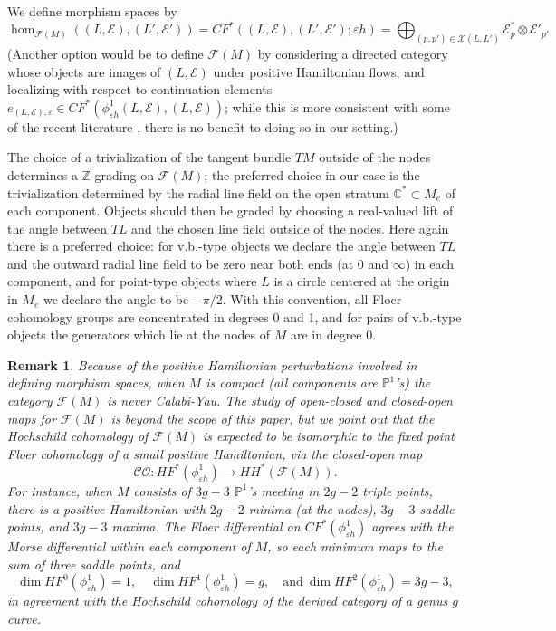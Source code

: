 \documentclass[11pt,leqno]{amsart}
\newtheorem{remark}[theo]{Remark}
\numberwithin{equation}{section}
\def\C{\mathbb{C}}
\def\Z{\mathbb{Z}}
\def\F{{\mathcal F}}
\def\PP{{\mathbb P}}
\newcommand{\cE}{{\mathcal E}}
\newcommand{\cX}{{\mathcal X}}
\begin{document}
We define morphism spaces by
\begin{equation} \label{eq:morphisms}
\hom_{\F(M)}((L,\cE),(L',\cE'))=CF^*((L,\cE),(L',\cE');\varepsilon h)=\bigoplus_{(p,p')\in \cX(L,L')} \cE_p^*\otimes
\cE'_{p'}
\end{equation}
(Another option would be to define $\F(M)$ by considering a directed category whose
objects are images of $(L,\cE)$ under positive Hamiltonian flows, and
localizing with respect to continuation elements $e_{(L,\cE),\varepsilon}\in
CF^*(\phi^1_{\varepsilon h}(L,\cE),(L,\cE))$; while this is more consistent
with some of the recent literature \cite{AA,AS}, there is no benefit
to doing so in our setting.)

The choice of a
trivialization of the tangent bundle $TM$ outside of the nodes determines
a $\Z$-grading on $\F(M)$;
the preferred choice in our case is the trivialization determined by the radial line
field on the open stratum $\C^*\subset M_e$ of each component.  Objects
should then be graded by choosing a
real-valued lift of the angle between $TL$ and the chosen line field outside
of the nodes. Here again there is a preferred choice: for
v.b.-type objects we declare the angle between $TL$ and the outward radial
line field to be zero near both ends (at $0$ and $\infty$) in each
component, and for point-type objects where $L$ is a circle centered at the
origin in $M_e$ we declare the angle to be $-\pi/2$. With this convention,
all Floer cohomology groups are concentrated in degrees 0 and 1, and for
pairs of v.b.-type objects the
generators which lie at the nodes of $M$ are in degree 0.

\begin{remark}
Because of the positive Hamiltonian perturbations involved in defining
morphism spaces, when $M$ is compact (all components are $\PP^1$\!'s) the category $\F(M)$ is never Calabi-Yau.
The study of open-closed and closed-open maps for $\F(M)$
is beyond the scope of this paper, but we point out that the
Hochschild cohomology of $\F(M)$ is expected to be isomorphic to the
fixed point Floer cohomology of a small positive Hamiltonian, via the
closed-open map $$\mathcal{CO}:HF^*(\phi^1_{\varepsilon h})\to HH^*(\F(M)).$$
For instance, when $M$ consists of $3g-3$
$\PP^1$'s meeting in $2g-2$ triple points, there is a positive Hamiltonian
with $2g-2$ minima (at the nodes), $3g-3$ saddle points, and $3g-3$
maxima. The Floer differential on $CF^*(\phi^1_{\varepsilon h})$
agrees with the Morse
differential within each component of $M$, so each minimum maps to the
sum of three saddle points, and
$$\dim HF^0(\phi^1_{\varepsilon h})=1,\quad 
\dim HF^1(\phi^1_{\varepsilon h})=g,\quad \text{and}\ 
\dim HF^2(\phi^1_{\varepsilon h})=3g-3,$$
in agreement with the Hochschild cohomology of 
the derived category of a genus $g$ curve.
\end{remark}
\end{document}
